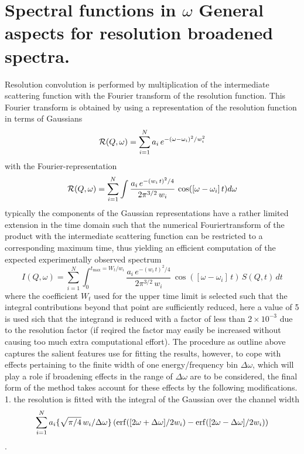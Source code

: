 \documentclass[11pt,fleqn]{book} %
\newcommand{\desc}[1]{\hskip 0.5cm {\color{descgray} #1}}
\begin{document}
\chapter{Spectral functions in ${\omega}$ \desc{General aspects for resolution broadened spectra.}}
Resolution convolution is performed by multiplication of the intermediate scattering function with the
Fourier transform of the resolution function. This Fourier transform is obtained by using a representation 
of the resolution function in terms of Gaussians
\begin{equation}
\label{eg:gares}
{\cal R}(Q,\omega) = \sum_{i=1}^{N} { a_i \, e^{-(\omega-\omega_i)^2/w_i^2} }
\end{equation}
with the Fourier-representation
\begin{equation}
\label{eg:garesF}
{\cal R}(Q,\omega) = \sum_{i=1}^{N} {\int \frac{a_i \, e^{-(w_i \, t)^2/4}}{ 2 \pi^{3/2} \, w_i }\, \cos([\omega-\omega_i]\,t) d\omega}
\end{equation}
typically the components of the Gaussian representations have a rather limited extension in
the time domain such that the numerical Fouriertransform of the product with the intermediate
scattering function can be restricted to a corresponding maximum time, thus yielding an 
efficient computation of the expected experimentally observed spectrum
\begin{equation}
\label{eq:conv1}
I(Q,\omega) = \sum_{i=1}^{N} { \int_0^{t_{\max} = W_t/w_i} {
\frac{a_i \, e^{-(w_i \, t)^2/4}}{ 2 \pi^{3/2} \, w_i } \, \cos([\omega-\omega_i]\, t) \, S(Q,t) \, dt 
}}
\end{equation}
where the coefficient $W_t$ used for the upper time limit is selected such that the integral
contributions beyond that point are sufficiently reduced, here a value of 5 is used sich that
the integrand is reduced with a factor of less than $2 \times 10^{-3}$ due to the resolution
factor (if reqired the factor may easily be increased without causing too much extra computational effort). 
The procedure as outline above captures the salient features use for fitting the results,
however, to cope with effects pertaining to the finite width of one energy/frequency bin
$\Delta \omega$, which will play a role if broadening effects in the range of $\Delta \omega$
are to be considered, the final form of the method takes account for these effects by the
following modifications.
1. the resolution is fitted with the integral of the Gaussian over the channel width 
%
\begin{equation} 
\sum_{i=1}^{N} { a_i \{ \sqrt{\pi/4}\, w_i/\Delta \omega \} \,(
{\rm erf}([2\omega+\Delta \omega]/2w_i)-{\rm erf}([2\omega-\Delta\omega]/2w_i)) 
}
\end{equation}
.
\end{document}
